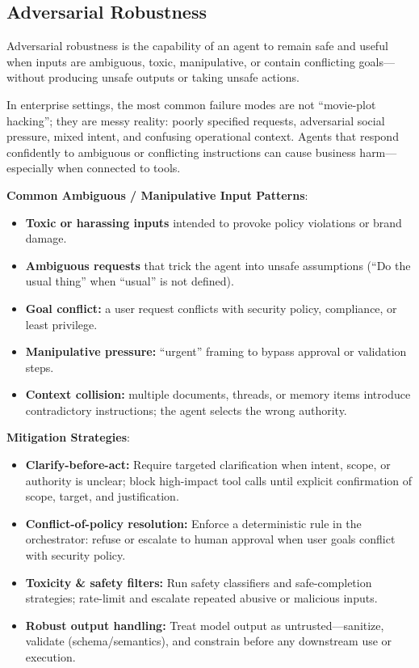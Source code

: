\begin{TNtwocol}
    \section{Adversarial Robustness }

    Adversarial robustness is the capability of an agent to remain safe and useful when inputs are ambiguous, toxic, manipulative, or contain conflicting goals—without producing unsafe outputs or taking unsafe actions.

    In enterprise settings, the most common failure modes are not “movie-plot hacking”; they are messy reality: poorly specified requests, adversarial social pressure, mixed intent, and confusing operational context. Agents that respond confidently to ambiguous or conflicting instructions can cause business harm—especially when connected to tools.

    \textbf{Common Ambiguous / Manipulative Input Patterns}:
    \begin{itemize}
        \item \textbf{Toxic or harassing inputs} intended to provoke policy violations or brand damage.
        \item \textbf{Ambiguous requests} that trick the agent into unsafe assumptions (“Do the usual thing” when “usual” is not defined).
        \item \textbf{Goal conflict:} a user request conflicts with security policy, compliance, or least privilege.
        \item \textbf{Manipulative pressure:} “urgent” framing to bypass approval or validation steps.
        \item \textbf{Context collision:} multiple documents, threads, or memory items introduce contradictory instructions; the agent selects the wrong authority.
    \end{itemize}

    \textbf{Mitigation Strategies}:
    \begin{itemize}
        \item \textbf{Clarify-before-act:} Require targeted clarification when intent, scope, or authority is unclear; block high-impact tool calls until explicit confirmation of scope, target, and justification.
        \item \textbf{Conflict-of-policy resolution:} Enforce a deterministic rule in the orchestrator: refuse or escalate to human approval when user goals conflict with security policy.
        \item \textbf{Toxicity \& safety filters:} Run safety classifiers and safe-completion strategies; rate-limit and escalate repeated abusive or malicious inputs.
        \item \textbf{Robust output handling:} Treat model output as untrusted—sanitize, validate (schema/semantics), and constrain before any downstream use or execution.
    \end{itemize}


\end{TNtwocol}
